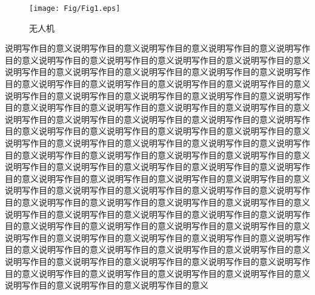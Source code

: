 \begin{figure}[!h]
	\centering
	\texttt{[image: Fig/Fig1.eps]}
	\caption{无人机}
	\label{fig:1}     
\end{figure}
说明写作目的意义说明写作目的意义说明写作目的意义说明写作目的意义说明写作目的意义说明写作目的意义说明写作目的意义说明写作目的意义说明写作目的意义说明写作目的意义说明写作目的意义说明写作目的意义说明写作目的意义说明写作目的意义说明写作目的意义说明写作目的意义说明写作目的意义说明写作目的意义说明写作目的意义说明写作目的意义说明写作目的意义说明写作目的意义说明写作目的意义说明写作目的意义说明写作目的意义说明写作目的意义说明写作目的意义说明写作目的意义说明写作目的意义说明写作目的意义说明写作目的意义说明写作目的意义说明写作目的意义说明写作目的意义说明写作目的意义说明写作目的意义说明写作目的意义说明写作目的意义说明写作目的意义说明写作目的意义说明写作目的意义说明写作目的意义说明写作目的意义说明写作目的意义说明写作目的意义说明写作目的意义说明写作目的意义说明写作目的意义说明写作目的意义说明写作目的意义说明写作目的意义说明写作目的意义说明写作目的意义说明写作目的意义说明写作目的意义说明写作目的意义说明写作目的意义说明写作目的意义说明写作目的意义说明写作目的意义说明写作目的意义说明写作目的意义说明写作目的意义说明写作目的意义说明写作目的意义说明写作目的意义说明写作目的意义说明写作目的意义说明写作目的意义说明写作目的意义说明写作目的意义说明写作目的意义说明写作目的意义说明写作目的意义说明写作目的意义说明写作目的意义说明写作目的意义说明写作目的意义说明写作目的意义说明写作目的意义说明写作目的意义说明写作目的意义说明写作目的意义说明写作目的意义说明写作目的意义说明写作目的意义说明写作目的意义说明写作目的意义说明写作目的意义说明写作目的意义说明写作目的意义说明写作目的意义说明写作目的意义\parencite{RN40}
\begin{table}[H]
	\centering
	\small
	\caption{数值}
\end{table}
